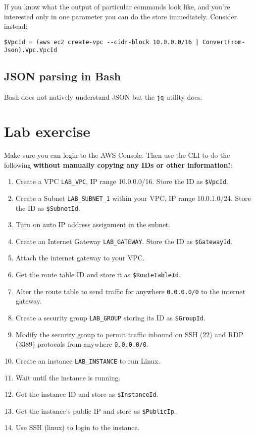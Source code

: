 \documentclass{pgnotes}
\begin{document}
If you know what the output of particular commands look like, and you're interested only in one parameter you can do the store immediately.
Consider instead:
\begin{verbatim}
$VpcId = (aws ec2 create-vpc --cidr-block 10.0.0.0/16 | ConvertFrom-Json).Vpc.VpcId
\end{verbatim}

\subsection{JSON parsing in Bash}

Bash does not natively understand JSON but the \texttt{jq} utility does.

\section{Lab exercise}

Make sure you can login to the AWS Console.
Then use the CLI to do the following \textbf{without manually copying any IDs or other information!}:
\begin{enumerate}
\item Create a VPC \texttt{LAB\_VPC}, IP range 10.0.0.0/16. Store the ID as \texttt{\$VpcId}. 
\item Create a Subnet \texttt{LAB\_SUBNET\_1} within your VPC, IP range 10.0.1.0/24. Store the ID as \texttt{\$SubnetId}. 
\item Turn on auto IP address assignment in the subnet.
\item Create an Internet Gateway \texttt{LAB\_GATEWAY}. Store the ID as \texttt{\$GatewayId}. 
\item Attach the internet gateway to your VPC.
\item Get the route table ID and store it as \texttt{\$RouteTableId}. 
\item Alter the route table to send traffic for anywhere \texttt{0.0.0.0/0} to the internet gateway.
\item Create a security group \texttt{LAB\_GROUP} storing its ID as \texttt{\$GroupId}. 
\item Modify the security group to permit traffic inbound on SSH (22) and RDP (3389) protocols from anywhere \texttt{0.0.0.0/0}.
\item Create an instance \texttt{LAB\_INSTANCE} to run Linux. 
\item Wait until the instance is running.
\item Get the instance ID and store as \texttt{\$InstanceId}. 
\item Get the instance's public IP and store as \texttt{\$PublicIp}. 
\item Use SSH (linux) to login to the instance.
\end{enumerate}
\end{document}
